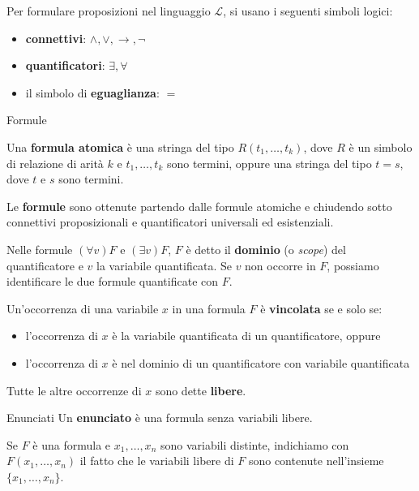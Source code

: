 \documentclass[a4paper,11pt]{report}
\begin{document}
Per formulare proposizioni nel linguaggio \( \mathcal{L} \), si usano i seguenti simboli logici:
\begin{itemize}
    \item \textbf{connettivi}: \( \land, \lor, \to, \neg \)
    \item \textbf{quantificatori}:  \( \exists, \forall \)
    \item il simbolo di \textbf{eguaglianza}:  \( = \)
\end{itemize}

\vspace{1em}

\begin{defframe}{Formule}{}
    
Una \textbf{formula atomica} è una stringa del tipo \( R(t_1, \dots, t_k) \), dove \( R \) è un simbolo di relazione di arità \( k \) e \( t_1, \dots, t_k \) sono termini, oppure una stringa del tipo \( t = s \), dove \( t \) e \( s \) sono termini.

Le \textbf{formule} sono ottenute partendo dalle formule atomiche e chiudendo sotto connettivi proposizionali e quantificatori universali ed esistenziali. 
\end{defframe}

Nelle formule \( (\forall v)F \) e \((\exists v)F\), \( F \) è detto il \textbf{dominio} (o \textit{scope}) del quantificatore e \( v \) la variabile quantificata. Se \( v \) non occorre in \( F \), possiamo identificare le due formule quantificate con \( F \). 

Un'occorrenza di una variabile \( x \) in una formula \( F \) è \textbf{vincolata} se e solo se:
\begin{itemize}
    \item l'occorrenza di \( x \) è la variabile quantificata di un quantificatore, oppure
    \item l'occorrenza di \( x \) è nel dominio di un quantificatore con variabile quantificata
\end{itemize}

Tutte le altre occorrenze di \( x \) sono dette \textbf{libere}.

\begin{defframe}{Enunciati}{}
Un \textbf{enunciato} è una formula senza variabili libere.
\end{defframe}

Se \( F \) è una formula e \( x_1, \dots, x_n \) sono variabili distinte, indichiamo con \( F(x_1, \dots, x_n) \) il fatto che le variabili libere di \( F \) sono contenute nell'insieme \( \{x_1, \dots, x_n\} \).
\end{document}
